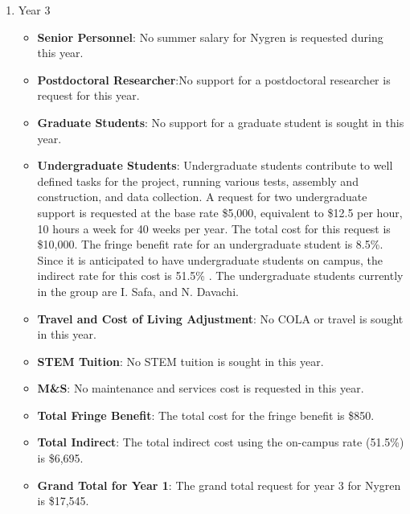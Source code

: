 \begin{enumerate}
\item{Year 3}
\begin{itemize}[noitemsep,nolistsep]
\item{{\bf Senior Personnel}: No summer salary for Nygren is requested during this year.}

\item {{\bf Postdoctoral Researcher}:No support for a postdoctoral researcher is request for this year.} 

\item{{\bf Graduate Students}: No support for a graduate student is sought in this year.}

\item {{\bf Undergraduate Students}: Undergraduate students contribute to well defined tasks for the project, running various tests, assembly and construction, and data collection.  A request for two undergraduate support is requested at the base rate \$5,000, equivalent to \$12.5 per hour, 10 hours a week for 40 weeks per year.  The total cost for this request is \$10,000.  The fringe benefit rate for an undergraduate student is 8.5\%.  Since it is anticipated to have undergraduate students on campus, the indirect rate for this cost is 51.5\% .  The undergraduate students currently in the group are I. Safa, and N. Davachi.}

\item{{\bf Travel and Cost of Living Adjustment}: No COLA or travel is sought in this year.}

\item {{\bf STEM Tuition}: No STEM tuition is sought in this year.}

\item {{\bf M\&S}: No maintenance and services cost is requested in this year.}

\item {{\bf Total Fringe Benefit}: The total cost for the fringe benefit is \$850.}

\item {{\bf Total Indirect}: The total indirect cost using the on-campus rate (51.5\%) is \$6,695.}

\item {{\bf Grand Total for Year 1}: The grand total request for year 3 for Nygren is \$17,545.}

\end{itemize}

\end{enumerate}




